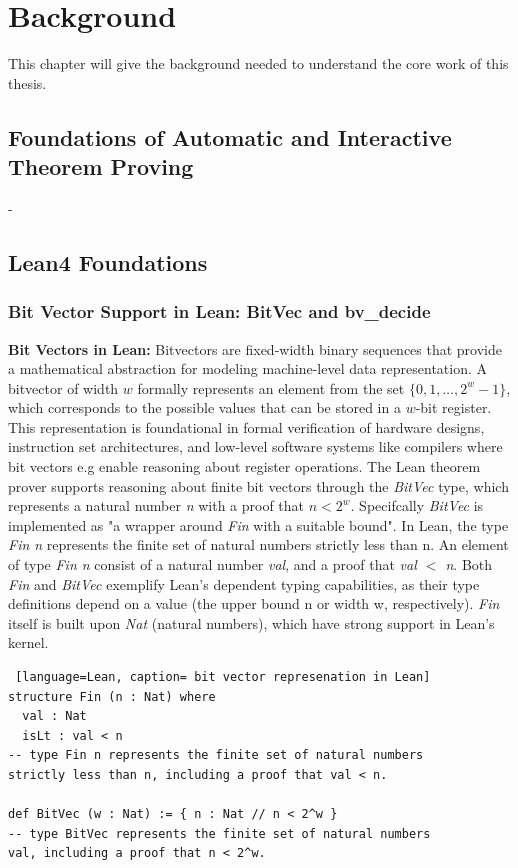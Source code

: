 
\chapter{Background }

This chapter will give the background needed to understand the core work of this thesis. 

\section{Foundations of Automatic and Interactive Theorem Proving} 
-

\section{Lean4 Foundations} 
\subsection{Bit Vector Support in Lean: BitVec and bv\_decide} 
\textbf{Bit Vectors in Lean:}
Bitvectors are fixed-width binary sequences that provide a mathematical abstraction for modeling machine-level data representation. A bitvector of width $w$ formally represents an element from the set $\{0, 1, \ldots, 2^w - 1\}$, which corresponds to the possible values that can be stored in a $w$-bit register. This representation is foundational in formal verification of hardware designs, instruction set architectures, and low-level software systems like compilers where bit vectors e.g enable reasoning about register operations. The Lean theorem prover supports reasoning about finite bit vectors through the \textit{BitVec} type, which represents a natural number \textit{n} with a proof that \( n < 2^w \). Specifcally \textit{BitVec} is implemented as "a wrapper around \textit{Fin} with a suitable bound". In Lean, the type \textit{Fin n} represents the finite set of natural numbers strictly less than n. An element of type \textit{Fin n} consist of a natural number \textit{val}, and a proof that \textit{val \( < \) n}. Both \textit{Fin} and  \textit{BitVec} exemplify Lean's dependent typing capabilities, as their type definitions depend on a value (the upper bound n or width w, respectively). \textit{Fin} itself is built upon \textit{Nat} (natural numbers), which have strong support in Lean's kernel.


\begin{lstlisting} [language=Lean, caption= bit vector represenation in Lean]
structure Fin (n : Nat) where
  val : Nat
  isLt : val < n 
-- type Fin n represents the finite set of natural numbers
strictly less than n, including a proof that val < n.

def BitVec (w : Nat) := { n : Nat // n < 2^w }
-- type BitVec represents the finite set of natural numbers
val, including a proof that n < 2^w.
\end{lstlisting}

